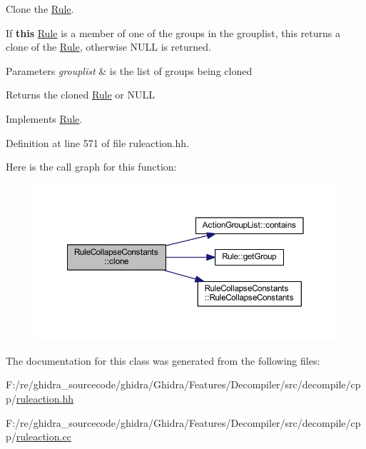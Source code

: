 Clone the \mbox{\hyperlink{class_rule}{Rule}}. 

If {\bfseries{this}} \mbox{\hyperlink{class_rule}{Rule}} is a member of one of the groups in the grouplist, this returns a clone of the \mbox{\hyperlink{class_rule}{Rule}}, otherwise N\+U\+LL is returned. 
\begin{DoxyParams}{Parameters}
{\em grouplist} & is the list of groups being cloned \\
\hline
\end{DoxyParams}
\begin{DoxyReturn}{Returns}
the cloned \mbox{\hyperlink{class_rule}{Rule}} or N\+U\+LL 
\end{DoxyReturn}


Implements \mbox{\hyperlink{class_rule_a70de90a76461bfa7ea0b575ce3c11e4d}{Rule}}.



Definition at line 571 of file ruleaction.\+hh.

Here is the call graph for this function\+:
\nopagebreak
\begin{figure}[H]
\begin{center}
\leavevmode
\includegraphics[width=350pt]{class_rule_collapse_constants_a72200e198cae9d858f56dab54bd476de_cgraph}
\end{center}
\end{figure}


The documentation for this class was generated from the following files\+:\begin{DoxyCompactItemize}
\item 
F\+:/re/ghidra\+\_\+sourcecode/ghidra/\+Ghidra/\+Features/\+Decompiler/src/decompile/cpp/\mbox{\hyperlink{ruleaction_8hh}{ruleaction.\+hh}}\item 
F\+:/re/ghidra\+\_\+sourcecode/ghidra/\+Ghidra/\+Features/\+Decompiler/src/decompile/cpp/\mbox{\hyperlink{ruleaction_8cc}{ruleaction.\+cc}}\end{DoxyCompactItemize}
